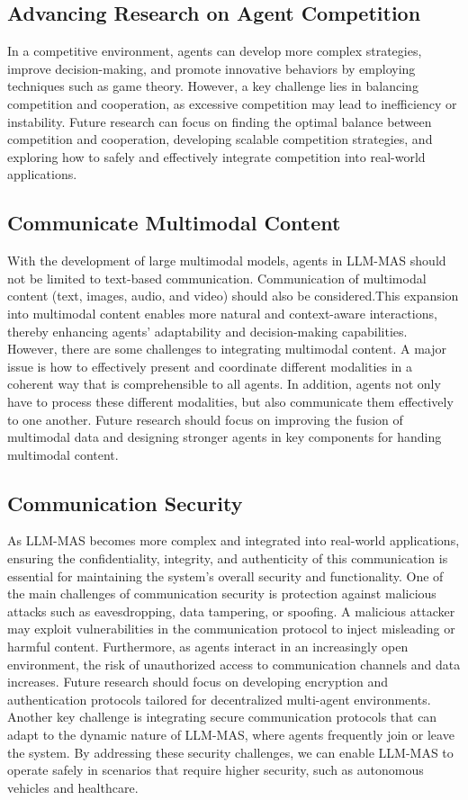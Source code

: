\subsection{Advancing Research on Agent Competition}
In a competitive environment, agents can develop more complex strategies, improve decision-making, and promote innovative behaviors by employing techniques such as game theory. However, a key challenge lies in balancing competition and cooperation, as excessive competition may lead to inefficiency or instability. Future research can focus on finding the optimal balance between competition and cooperation, developing scalable competition strategies, and exploring how to safely and effectively integrate competition into real-world applications.
\subsection{Communicate Multimodal Content}
With the development of large multimodal models, agents in LLM-MAS should not be limited to text-based communication. Communication of multimodal content (text, images, audio, and video) should also be considered.This expansion into multimodal content enables more natural and context-aware interactions, thereby enhancing agents' adaptability and decision-making capabilities. However, there are some challenges to integrating multimodal content. A major issue is how to effectively present and coordinate different modalities in a coherent way that is comprehensible to all agents. In addition, agents not only have to process these different modalities, but also communicate them effectively to one another. Future research should focus on improving the fusion of multimodal data and designing stronger agents in key components for handing multimodal content. 
\subsection{Communication Security}
As LLM-MAS becomes more complex and integrated into real-world applications, ensuring the confidentiality, integrity, and authenticity of this communication is essential for maintaining the system's overall security and functionality. One of the main challenges of communication security is protection against malicious attacks such as eavesdropping, data tampering, or spoofing. A malicious attacker may exploit vulnerabilities in the communication protocol to inject misleading or harmful content. Furthermore, as agents interact in an increasingly open environment, the risk of unauthorized access to communication channels and data increases. Future research should focus on developing encryption and authentication protocols tailored for decentralized multi-agent environments. Another key challenge is integrating secure communication protocols that can adapt to the dynamic nature of LLM-MAS, where agents frequently join or leave the system. By addressing these security challenges, we can enable LLM-MAS to operate safely in scenarios that require higher security, such as autonomous vehicles and healthcare. 

